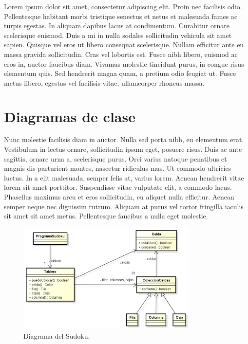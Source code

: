 \documentclass[titlepage,a4paper]{article}
\begin{document}
Lorem ipsum dolor sit amet, consectetur adipiscing elit. Proin nec facilisis odio. Pellentesque habitant morbi tristique senectus et netus et malesuada fames ac turpis egestas. In aliquam dapibus lacus at condimentum. Curabitur ornare scelerisque euismod. Duis a mi in nulla sodales sollicitudin vehicula sit amet sapien. Quisque vel eros ut libero consequat scelerisque. Nullam efficitur ante eu massa gravida sollicitudin. Cras vel lobortis est. Fusce nibh libero, euismod ac eros in, auctor faucibus diam. Vivamus molestie tincidunt purus, in congue risus elementum quis. Sed hendrerit magna quam, a pretium odio feugiat ut. Fusce metus libero, egestas vel facilisis vitae, ullamcorper rhoncus massa.


\section{Diagramas de clase}\label{sec:diagramasdeclase}

Nunc molestie facilisis diam in auctor. Nulla sed porta nibh, eu elementum erat. Vestibulum in lectus ornare, sollicitudin ipsum eget, posuere risus. Duis ac ante sagittis, ornare urna a, scelerisque purus. Orci varius natoque penatibus et magnis dis parturient montes, nascetur ridiculus mus. Ut commodo ultricies luctus. In a elit malesuada, semper felis at, varius lorem. Aenean hendrerit vitae lorem sit amet porttitor. Suspendisse vitae vulputate elit, a commodo lacus. Phasellus maximus arcu et eros sollicitudin, eu aliquet nulla efficitur. Aenean semper neque nec dignissim rutrum. Aliquam at purus vel tortor fringilla iaculis sit amet sit amet metus. Pellentesque faucibus a nulla eget molestie.

\begin{figure}[H]
\centering
\includegraphics[width=0.8\textwidth]{diagrama_clase01.png}
\caption{\label{fig:class01}Diagrama del Sudoku.}
\end{figure}
\end{document}
